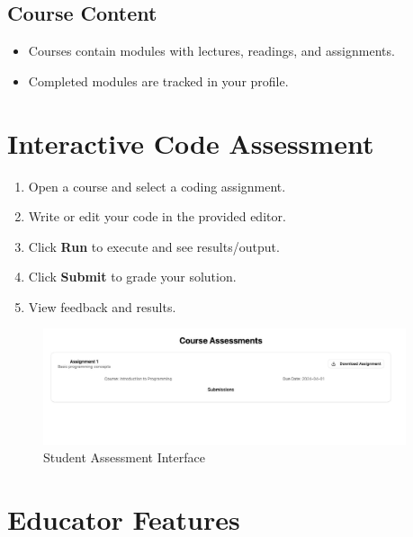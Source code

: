 \documentclass[a4paper,11pt]{scrartcl}
\begin{document}
\subsection{Course Content}
\begin{itemize}[leftmargin=*]
    \item Courses contain modules with lectures, readings, and assignments.
    \item Completed modules are tracked in your profile.
\end{itemize}

\section{Interactive Code Assessment}

\begin{enumerate}[leftmargin=*]
    \item Open a course and select a coding assignment.
    \item Write or edit your code in the provided editor.
    \item Click \textbf{Run} to execute and see results/output.
    \item Click \textbf{Submit} to grade your solution.
    \item View feedback and results.
\end{enumerate}
\begin{figure}[H]
    \centering
    \includegraphics[width=0.95\textwidth]{StudentAssessment.jpg}
    \caption{Student Assessment Interface}
\end{figure}

\section{Educator Features}
\end{document}
